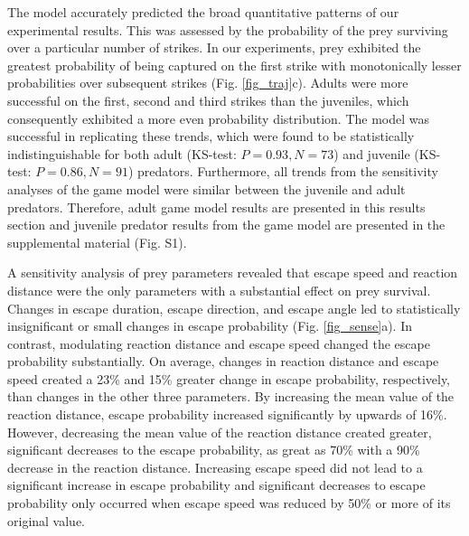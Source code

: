 \documentclass[]{rsos}%
\begin{document}
The model accurately predicted the broad quantitative patterns of our experimental results.
This was assessed by the probability of the prey surviving over a particular number of strikes. 
In our experiments, prey exhibited the greatest probability of being captured on the first strike with monotonically lesser probabilities over subsequent strikes (Fig. \ref{fig_traj}c).
Adults were more successful on the first, second and third strikes than the juveniles, which consequently exhibited a more even probability distribution.
The model was successful in replicating these trends, which were found to be statistically indistinguishable for both adult (KS-test: $P = 0.93, N = 73$) and juvenile (KS-test: $P = 0.86, N = 91$) predators. 
Furthermore, all trends from the sensitivity analyses of the game model were similar between the juvenile and adult predators. 
Therefore, adult game model results are presented in this results section and juvenile predator results from the game model are presented in the supplemental material (Fig. S1).


A sensitivity analysis of prey parameters revealed that escape speed and reaction distance were the only parameters with a substantial effect on prey survival. 
Changes in escape duration, escape direction, and escape angle led to statistically insignificant or small changes in escape probability (Fig. \ref{fig_sense}a). 
In contrast, modulating reaction distance and escape speed changed the escape probability substantially.
On average, changes in reaction distance and escape speed created a 23\% and 15\% greater change in escape probability, respectively, than changes in the other three parameters.
By increasing the mean value of the reaction distance, escape probability increased significantly by upwards of 16\%. 
However, decreasing the mean value of the reaction distance created greater, significant decreases to the escape probability, as great as 70\% with a  90\% decrease in the reaction distance. 
Increasing escape speed did not lead to a significant increase in escape probability and significant decreases to escape probability only occurred when escape speed was reduced by 50\% or more of its original value.
\end{document}
